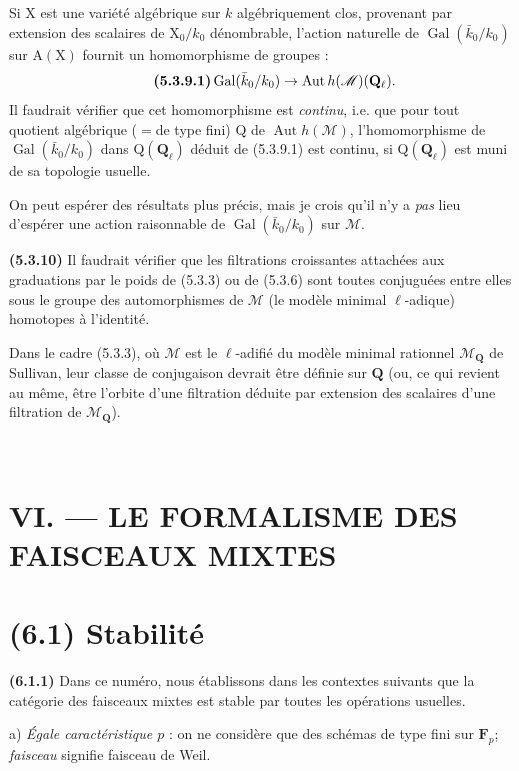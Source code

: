 \documentclass[11pt,leqno]{article}
\newcommand{\Page}[1]{\ifvmode\noindent\else\unskip\ \fi{\footnotesize\textcolor{gray}{[p.\,#1]}}\ \ignorespaces}
\begin{document}
Si \(\mathrm{X}\) est une variété algébrique sur \(k\) algébriquement
clos, provenant par extension des scalaires de \(\mathrm{X}_0/k_0\)
dénombrable, l’action naturelle de \(\operatorname{Gal}(\bar{k}_0/k_0)\)
sur \(\mathrm{A}(\mathrm{X})\) fournit un homomorphisme de groupes :
\[
\tag*{\textbf{(5.3.9.1)}}
\operatorname{Gal}(\bar{k}_0/k_0)
\to\operatorname{Aut}h(\mathscr{M})(\mathbf{Q}_\ell).
\]
Il faudrait vérifier que cet homomorphisme est \textit{continu}, i.e.
que pour tout quotient algébrique (\(=\)de type fini) \(\mathrm{Q}\)
de \(\operatorname{Aut}h(\mathscr{M})\), l’homomorphisme de
\(\operatorname{Gal}(\bar{k}_0/k_0)\) dans \(\mathrm{Q}(\mathbf{Q}_\ell)\)
déduit de (5.3.9.1) est continu, si \(\mathrm{Q}(\mathbf{Q}_\ell)\)
est muni de sa topologie usuelle.

On peut espérer des résultats plus précis, mais je crois qu’il n’y a
\textit{pas} lieu d’espérer une action raisonnable de
\(\operatorname{Gal}(\bar{k}_0/k_0)\) sur \(\mathscr{M}\).

\textbf{(5.3.10)} Il faudrait vérifier que les filtrations croissantes
attachées aux graduations par le poids de (5.3.3) ou de (5.3.6) sont
toutes conjuguées entre elles sous le groupe des automorphismes de
\(\mathscr{M}\) (le modèle minimal \(\ell\)-adique) homotopes à l’identité.

Dans le cadre (5.3.3), où \(\mathscr{M}\) est le \(\ell\)-adifié du
modèle minimal rationnel \(\mathscr{M}_{\mathbf{Q}}\) de Sullivan,
leur classe de conjugaison devrait être définie sur \(\mathbf{Q}\)
(ou, ce qui revient au même, être l’orbite d’une filtration déduite
par extension des scalaires d’une filtration de
\(\mathscr{M}_{\mathbf{Q}}\)).

\Page{243}
\section*{VI. — LE FORMALISME DES FAISCEAUX MIXTES}

\section*{(6.1) Stabilité}

\textbf{(6.1.1)} Dans ce numéro, nous établissons dans les contextes
suivants que la catégorie des faisceaux mixtes est stable par toutes
les opérations usuelles.

a) \textit{Égale caractéristique \(p\)} : on ne considère que des
schémas de type fini sur \(\mathbf{F}_p\); \textit{faisceau} signifie
faisceau de Weil.
\end{document}
